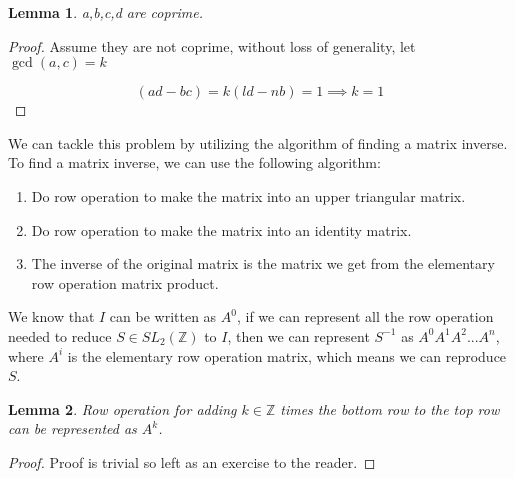 \documentclass[11pt]{article}
\newcommand{\Z}{\mathbb{Z}}
\newtheorem{lemma}{Lemma}
\begin{document}


\begin{center}
\end{center}



\begin{lemma}\label{lem1}
	a,b,c,d are coprime.
\end{lemma}

\begin{proof}
	Assume they are not coprime,
	without loss of generality, let $\operatorname{gcd}(a,c)=k$

	\[
		(ad-bc)=k(ld-nb) =1 \implies k=1
	\]
\end{proof}

We can tackle this problem by utilizing the algorithm of finding a matrix inverse.
To find a matrix inverse, we can use the following algorithm:

\begin{enumerate}
	\item Do row operation to make the matrix into an upper triangular matrix.
	\item Do row operation to make the matrix into an identity matrix.
	\item The inverse of the original matrix is the matrix we get from the elementary row operation matrix product.
\end{enumerate}

We know that $I$ can be written as $A^{0}$,
if we can represent all the row operation needed to reduce $S \in SL_2(\Z)$ to $I$,
then we can represent $S^{-1}$ as $A^{0}A^{1}A^{2}...A^{n}$,
where $A^{i}$ is the elementary row operation matrix,
which means we can reproduce $S$.

\begin{lemma}
	Row operation for adding $k \in \Z$ times the bottom row to the top row can be represented as $A^{k}$.
\end{lemma}

\begin{proof}
	Proof is trivial so left as an exercise to the reader.
\end{proof}
\end{document}

